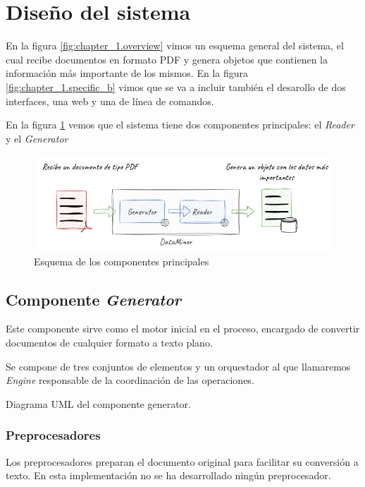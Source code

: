 \section{Diseño del sistema}

En la figura \ref{fig:chapter_1.overview} vimos un esquema general del sistema, el cual recibe documentos en formato
PDF y genera objetos que contienen la información más importante de los mismos.
En la figura \ref{fig:chapter_1.specific_b} vimos que se va a incluir también el desarollo de dos interfaces, una web
y una de línea de comandos.

En la figura \ref{fig:chapter_4.overview} vemos que el sistema tiene dos componentes principales: el \textit{Reader}
y el \textit{Generator}

\begin{figure}[ht]
    \begin{center}
        \includegraphics[width=\textwidth]{./chapter/4/images/chapter_4.overview}
        \caption{Esquema de los componentes principales}
        \label{fig:chapter_4.overview}
    \end{center}
\end{figure}

\subsection*{Componente \textit{Generator}}\label{subsec:chapter_4.generator_component}

Este componente sirve como el motor inicial en el proceso, encargado de convertir documentos de cualquier formato a
texto plano.

Se compone de tres conjuntos de elementos y un orquestador al que llamaremos \textit{Engine} responsable de la
coordinación de las operaciones.

Diagrama UML del componente generator.

\subsubsection*{Preprocesadores}
Los preprocesadores preparan el documento original para facilitar su conversión a texto.
En esta implementación no se ha desarrollado ningún preprocesador.

